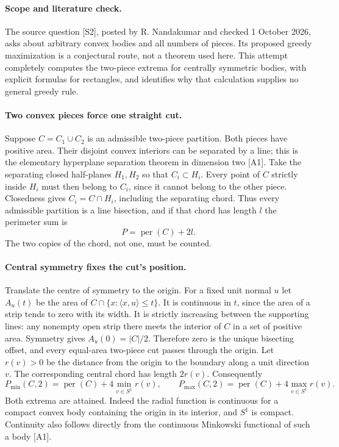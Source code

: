 \documentclass[11pt,a4paper]{article}
\begin{document}
\paragraph{Scope and literature check.}
The source question [S2], posted by R. Nandakumar and checked 1 October 2026,
asks about arbitrary convex bodies and all numbers of pieces. Its proposed
greedy maximization is a conjectural route, not a theorem used here. This
attempt completely computes the two-piece extrema for centrally symmetric
bodies, with explicit formulas for rectangles, and identifies why that
calculation supplies no general greedy rule.

\paragraph{Two convex pieces force one straight cut.}
Suppose $C=C_1\cup C_2$ is an admissible two-piece partition. Both pieces have
positive area. Their disjoint convex interiors can be separated by a line;
this is the elementary hyperplane separation theorem in dimension two [A1].
Take the separating closed half-planes $H_1,H_2$ so that $C_i\subset H_i$.
Every point of $C$ strictly inside $H_i$ must then belong to $C_i$, since it
cannot belong to the other piece. Closedness gives $C_i=C\cap H_i$, including
the separating chord. Thus every admissible partition is a line bisection,
and if that chord has length $l$ the perimeter sum is
\[
                         P=\operatorname{per}(C)+2l.
\]
The two copies of the chord, not one, must be counted.

\paragraph{Central symmetry fixes the cut's position.}
Translate the centre of symmetry to the origin. For a fixed unit normal $u$
let $A_u(t)$ be the area of $C\cap\{x:\langle x,u\rangle\le t\}$.
It is continuous in $t$, since the area of a strip tends to zero with its
width. It is strictly increasing between the supporting lines: any nonempty
open strip there meets the interior of $C$ in a set of positive area.
Symmetry gives $A_u(0)=|C|/2$. Therefore zero is the unique bisecting offset,
and every equal-area two-piece cut passes through the origin.
Let $r(v)>0$ be the distance from the origin to the boundary along a unit
direction $v$. The corresponding central chord has length $2r(v)$.
Consequently
\[
 P_{\min}(C,2)=\operatorname{per}(C)+4\min_{v\in S^1}r(v),\qquad
 P_{\max}(C,2)=\operatorname{per}(C)+4\max_{v\in S^1}r(v).
\]
Both extrema are attained. Indeed the radial function is continuous for a
compact convex body containing the origin in its interior, and $S^1$ is
compact. Continuity also follows directly from the continuous Minkowski
functional of such a body [A1].
\end{document}
